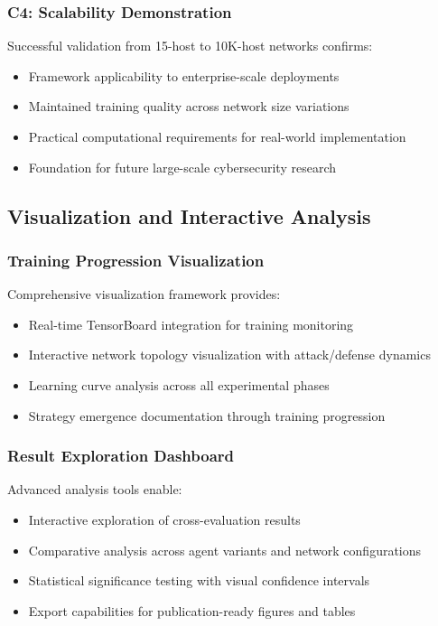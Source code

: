\documentclass[11pt]{article}
\newcounter{phase}[algorithm]
\theoremstyle{definition}
\theoremstyle{plain}
\begin{document}
\subsubsection{C4: Scalability Demonstration}
Successful validation from 15-host to 10K-host networks confirms:
\begin{itemize}
\item Framework applicability to enterprise-scale deployments
\item Maintained training quality across network size variations
\item Practical computational requirements for real-world implementation
\item Foundation for future large-scale cybersecurity research
\end{itemize}

\subsection{Visualization and Interactive Analysis}

\subsubsection{Training Progression Visualization}
Comprehensive visualization framework provides:
\begin{itemize}
\item Real-time TensorBoard integration for training monitoring
\item Interactive network topology visualization with attack/defense dynamics
\item Learning curve analysis across all experimental phases
\item Strategy emergence documentation through training progression
\end{itemize}

\subsubsection{Result Exploration Dashboard}
Advanced analysis tools enable:
\begin{itemize}
\item Interactive exploration of cross-evaluation results
\item Comparative analysis across agent variants and network configurations
\item Statistical significance testing with visual confidence intervals
\item Export capabilities for publication-ready figures and tables
\end{itemize}
\end{document}
